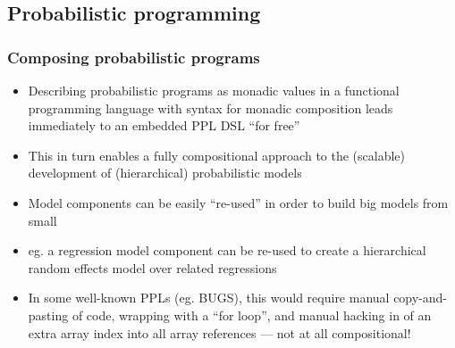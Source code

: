 \documentclass[mathserif,handout]{beamer}
\begin{document}
\subsection{Probabilistic programming}

\begin{frame}
  \frametitle{Composing probabilistic programs}
  \begin{itemize}
  \item Describing probabilistic programs as \alert{monadic values} in a functional programming language with syntax for monadic composition leads immediately to an \alert{embedded PPL DSL} ``for free''
  \item This in turn enables a fully \alert{compositional} approach to the (scalable) development of (hierarchical) probabilistic models
  \item Model components can be easily ``re-used'' in order to build big models from small
  \item eg. a regression model component can be re-used to create a hierarchical random effects model over related regressions
    \item In some well-known PPLs (eg. BUGS), this would require manual copy-and-pasting of code, wrapping with a ``for loop'', and manual hacking in of an extra array index into all array references --- not at all compositional!
  \end{itemize}
\end{frame}
\end{document}
